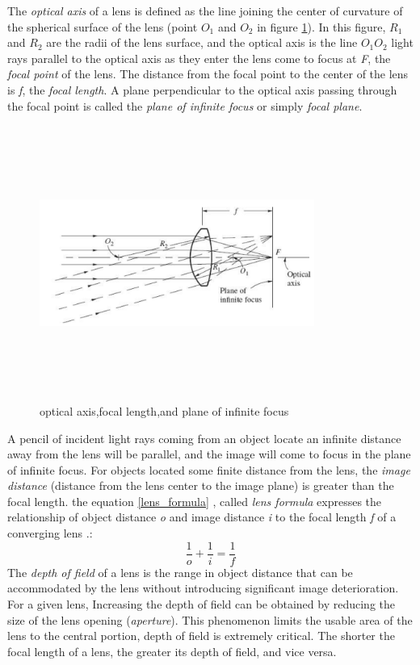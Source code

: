 The \textit{optical axis} of a lens is defined as the line joining the center of curvature of the spherical surface of the lens (point $O_{1}$ and $O_{2}$ in figure \ref{fig:optical_axis}). In this figure, $R_{1}$ and $R_{2}$ are the radii of the lens surface, and the optical axis is the line $O_{1}O_{2}$ light rays parallel to the optical axis as they enter the lens come to focus at \textit{F}, the \textit{focal point} of the lens. The distance from the focal point to the center of the lens is \textit{f}, the \textit{focal length}. A plane perpendicular to the optical axis passing through the focal point is called the \textit{plane of infinite focus} or simply \textit{focal plane}\cite{elements_photogrammetry}.
\begin{figure}[H]
\centering
\includegraphics[width=9cm,height=9cm,keepaspectratio]{imagenes/optical_axis.PNG}
\caption{optical axis,focal length,and plane of infinite focus}
\label{fig:optical_axis}
\end{figure}
A pencil of incident light rays coming from an object locate an infinite distance away from the lens will be parallel, and the image will come to focus in the plane of infinite focus. For objects located some finite distance from the lens, the \textit{image distance} (distance from the lens center to the image plane) is greater than the focal length. the equation \ref{lens_formula} , called \textit{lens formula} expresses the relationship of object distance  \textit{o} and image distance \textit{i} to the focal length \textit{f} of a converging lens \cite{elements_photogrammetry}.:
\begin{equation}
\frac{1}{o}+\frac{1}{i}=\frac{1}{f}
\label{lens_formula}
\end{equation}
The \textit{depth of field} of a lens is the range in object distance that can be accommodated by the lens without introducing significant image deterioration. For a given lens, Increasing the depth of field can be obtained by reducing the size of the lens opening (\textit{aperture}). This phenomenon limits the usable area of the lens to the central portion, depth of field is extremely critical. The shorter the focal length of a lens, the greater its depth of field, and vice versa.\cite{elements_photogrammetry}
